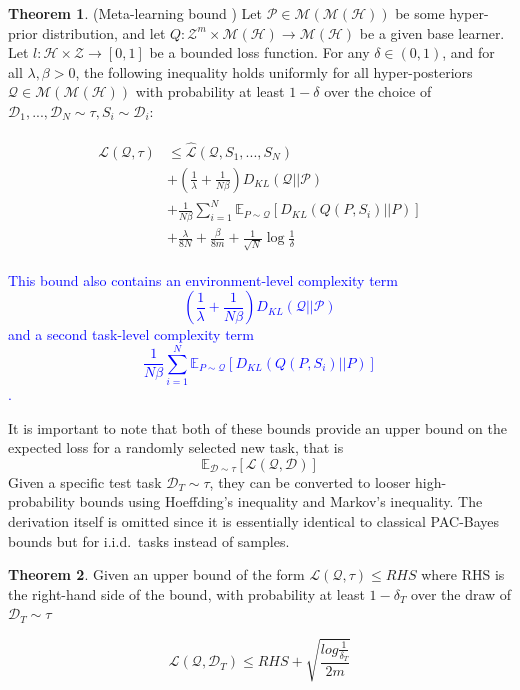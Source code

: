 \documentclass{article}
\theoremstyle{definition}
\newtheorem{theorem}{Theorem}[section]
\newcommand{\Expect}[2]{\mathbb{E}_{#1}\left [#2 \right ]}
\newcommand{\LFe}[1]{\textcolor{blue}{#1}}
\begin{document}
\begin{theorem} (Meta-learning bound \citep{Rothfuss2020}) \label{thm:meta-pb-rothfuss}
	Let $\mathcal{P}\in \mathcal{M}(\mathcal{M}(\mathcal{H}))$ be some hyper-prior distribution, and let $Q: \mathcal{Z}^m\times\mathcal{M}(\mathcal{H})\rightarrow \mathcal{M}(\mathcal{H})$ be a given base learner. Let $l: \mathcal{H}\times \mathcal{Z}\rightarrow [0, 1]$ be a bounded loss function.
	For any $\delta \in (0,1)$, and for all $\lambda, \beta >0$, the following inequality holds uniformly for all hyper-posteriors $\mathcal{Q}\in \mathcal{M}(\mathcal{M}(\mathcal{H}))$ with probability at least $1-\delta$ over the choice of $\mathcal{D}_1,...,\mathcal{D}_N\sim \tau, S_i\sim \mathcal{D}_i$:
	
	\begin{align} \label{eq:meta-pb-rothfuss}
	\begin{split}
	\mathcal{L}(\mathcal{Q}, \tau) &\leq \hat{\mathcal{L}}(\mathcal{Q}, S_1,...,S_N) \\
	&+\left (\frac{1}{\lambda}+\frac{1}{N\beta} \right )D_{KL}(\mathcal{Q}||\mathcal{P}) \\
	&+\frac{1}{N\beta}\sum_{i=1}^{N}\Expect{P\sim \mathcal{Q}}{D_{KL}(Q(P,S_i)||P)} \\
	&+\frac{\lambda}{8N}+\frac{\beta}{8m}+\frac{1}{\sqrt{N}}\log\frac{1}{\delta}
	\end{split}
	\end{align}
	
\end{theorem}

\LFe{This bound also contains an environment-level complexity term $$\left (\frac{1}{\lambda}+\frac{1}{N\beta} \right )D_{KL}(\mathcal{Q}||\mathcal{P})$$ and a second task-level complexity term $$\frac{1}{N\beta}\sum_{i=1}^{N}\Expect{P\sim \mathcal{Q}}{D_{KL}(Q(P,S_i)||P)}$$.}

It is important to note that both of these bounds provide an upper bound on the expected loss for a randomly selected new task, that is
$$\Expect{\mathcal{D}\sim \tau}{\mathcal{L}(\mathcal{Q}, \mathcal{D})}$$
Given a specific test task $\mathcal{D}_T\sim \tau$, they can be converted to looser high-probability bounds using Hoeffding's inequality and Markov's inequality. The derivation itself is omitted since it is essentially identical to classical PAC-Bayes bounds but for i.i.d.\ tasks instead of samples.

\begin{theorem} \label{thm:meta-highprob}
Given an upper bound of the form $\mathcal{L}(\mathcal{Q}, \tau) \leq RHS$ where RHS is the right-hand side of the bound, with probability at least $1-\delta_T$ over the draw of $\mathcal{D}_T\sim \tau$

$$ \mathcal{L}(\mathcal{Q}, \mathcal{D}_T) \leq RHS + \sqrt{\frac{log\frac{1}{\delta_T}}{2m}}$$

\end{theorem}
\end{document}
